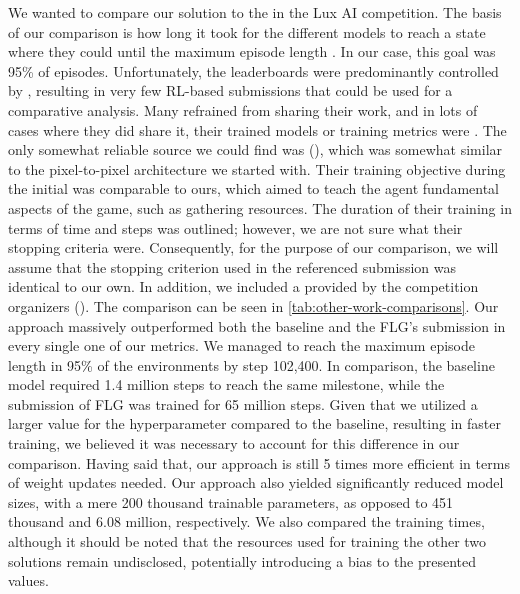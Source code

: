 \bigskip

\noindent We wanted to compare our solution to the  in the Lux AI competition. The basis of our comparison is how long it took for the different models to reach a state where they could  until the maximum episode length . In our case, this goal was 95\% of episodes. Unfortunately, the leaderboards were predominantly controlled by , resulting in very few RL-based submissions that could be used for a comparative analysis. Many refrained from sharing their work, and in lots of cases where they did share it, their trained models or training metrics were . The only somewhat reliable source we could find was  (\cite{ferdinand}), which was somewhat similar to the pixel-to-pixel architecture we started with. Their training objective during the initial  was comparable to ours, which aimed to teach the agent fundamental aspects of the game, such as gathering resources. The duration of their training in terms of time and steps was outlined; however, we are not sure what their stopping criteria were. Consequently, for the purpose of our comparison, we will assume that the stopping criterion used in the referenced submission was identical to our own. In addition, we included a  provided by the competition organizers (\cite{luxai_s2-baseline-source}). The comparison can be seen in \autoref{tab:other-work-comparisons}. Our approach massively outperformed both the baseline and the FLG's submission in every single one of our metrics. We managed to reach the maximum episode length in 95\% of the environments by step 102,400. In comparison, the baseline model required 1.4 million steps to reach the same milestone, while the submission of FLG was trained for 65 million steps. Given that we utilized a larger value for the hyperparameter  compared to the baseline, resulting in faster training, we believed it was necessary to account for this difference in our comparison. Having said that, our approach is still 5 times more efficient in terms of weight updates needed. Our approach also yielded significantly reduced model sizes, with a mere 200 thousand trainable parameters, as opposed to 451 thousand and 6.08 million, respectively. We also compared the training times, although it should be noted that the resources used for training the other two solutions remain undisclosed, potentially introducing a bias to the presented values.


